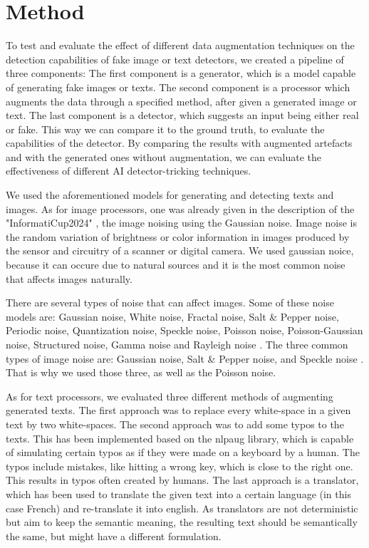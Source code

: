 \documentclass{article} %
\begin{document}
\section{Method}
To test and evaluate the effect of different data augmentation techniques on the detection capabilities of fake image or text detectors, we created a pipeline of three components: The first component is a generator, which is a model capable of generating fake images or texts. The second component is a processor which augments the data through a specified method, after given a generated image or text. The last component is a detector, which suggests an input being either real or fake. This way we can compare it to the ground truth, to evaluate the capabilities of the detector. By comparing the results with augmented artefacts and with the generated ones without augmentation, we can evaluate the effectiveness of different AI detector-tricking techniques.

We used the aforementioned models for generating and detecting texts and images. As for image processors, one was already given in the description of the "InformatiCup2024" \cite{InformatiCup}, the image noising using the Gaussian noise. Image noise is the random variation of brightness or color information in images produced by the sensor and circuitry of a scanner or digital camera. We used gaussian noice, because it can occure due to natural sources and it is the most common noise that affects images naturally. \cite{mohammed2016study}

There are several types of noise that can affect images. Some of these noise models are: Gaussian noise, White noise, Fractal noise, Salt \& Pepper noise, Periodic noise, Quantization noise, Speckle noise, Poisson noise, Poisson-Gaussian noise, Structured noise, Gamma noise and Rayleigh noise \cite{gonzalez2009digital}. The three common types of image noise are: Gaussian noise, Salt \& Pepper noise, and Speckle noise \cite{al2010comparative}. That is why we used those three, as well as the Poisson noise.

As for text processors, we evaluated three different methods of augmenting generated texts. The first approach was to replace every white-space in a given text by two white-spaces. The second approach was to add some typos to the texts. This has been implemented based on the nlpaug library, which is capable of simulating certain typos as if they were made on a keyboard by a human. The typos include mistakes, like hitting a wrong key, which is close to the right one. This results in typos often created by humans. The last approach is a translator, which has been used to translate the given text into a certain language (in this case French) and re-translate it into english. As translators are not deterministic but aim to keep the semantic meaning, the resulting text should be semantically the same, but might have a different formulation.
\end{document}
